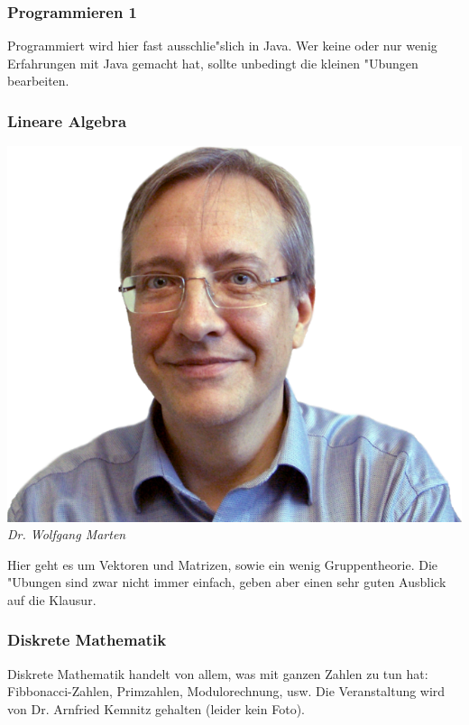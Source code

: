\subsubsection{Programmieren 1}

Programmiert wird hier fast ausschlie"slich in Java. Wer keine oder nur wenig Erfahrungen mit Java gemacht hat, sollte unbedingt die kleinen "Ubungen bearbeiten.

\subsubsection{Lineare Algebra}

\includegraphics[width=0.8\linewidth]{bilder/dozenten/marten_frei.png}\\
\textit{Dr. Wolfgang Marten}

Hier geht es um Vektoren und Matrizen, sowie ein wenig Gruppentheorie.
Die "Ubungen sind zwar nicht immer einfach, geben aber einen sehr guten Ausblick auf die Klausur.

\subsubsection{Diskrete Mathematik}

Diskrete Mathematik handelt von allem, was mit ganzen Zahlen zu tun hat: Fibbonacci-Zahlen, Primzahlen, Modulorechnung, usw.
Die Veranstaltung wird von Dr. Arnfried Kemnitz gehalten (leider kein Foto).


